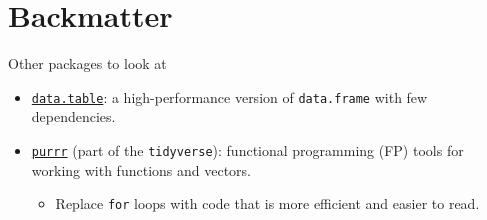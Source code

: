 \documentclass[
  11pt,
  ignorenonframetext,
]{beamer}
\providecommand{\tightlist}{%
  \setlength{\itemsep}{0pt}\setlength{\parskip}{0pt}}
\begin{document}
\hypertarget{backmatter}{%
\section{Backmatter}\label{backmatter}}

\begin{frame}[fragile]{Other packages to look at}
\protect\hypertarget{other-packages-to-look-at}{}
\begin{itemize}
\item
  \href{https://rdatatable.gitlab.io/data.table/}{\texttt{data.table}}:
  a high-performance version of \texttt{data.frame} with few
  dependencies.
\item
  \href{https://purrr.tidyverse.org/}{\texttt{purrr}} (part of the
  \texttt{tidyverse}): functional programming (FP) tools for working
  with functions and vectors.

  \begin{itemize}
  \tightlist
  \item
    Replace \texttt{for} loops with code that is more efficient and
    easier to read.
  \end{itemize}
\end{itemize}
\end{frame}
\end{document}
